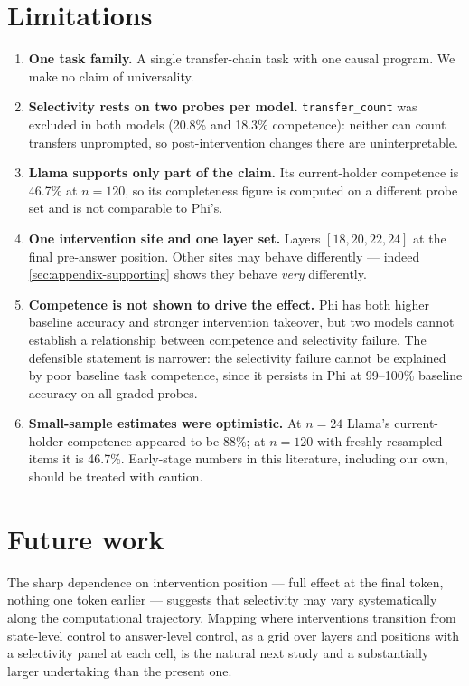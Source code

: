 \documentclass[11pt]{article}
\begin{document}
\section{Limitations}
\label{sec:limitations}

\begin{enumerate}
  \item \textbf{One task family.} A single transfer-chain task with one causal
    program. We make no claim of universality.
  \item \textbf{Selectivity rests on two probes per model.}
    \texttt{transfer\_count} was excluded in both models (20.8\% and 18.3\%
    competence): neither can count transfers unprompted, so post-intervention
    changes there are uninterpretable.
  \item \textbf{Llama supports only part of the claim.} Its current-holder
    competence is 46.7\% at $n=120$, so its completeness figure is computed on
    a different probe set and is not comparable to Phi's.
  \item \textbf{One intervention site and one layer set.} Layers
    $[18, 20, 22, 24]$ at the final pre-answer position. Other sites may
    behave differently --- indeed \cref{sec:appendix-supporting} shows they
    behave \emph{very} differently.
  \item \textbf{Competence is not shown to drive the effect.} Phi has both
    higher baseline accuracy and stronger intervention takeover, but two
    models cannot establish a relationship between competence and selectivity
    failure. The defensible statement is narrower: the selectivity failure
    cannot be explained by poor baseline task competence, since it persists in
    Phi at 99--100\% baseline accuracy on all graded probes.
  \item \textbf{Small-sample estimates were optimistic.} At $n=24$ Llama's
    current-holder competence appeared to be 88\%; at $n=120$ with freshly
    resampled items it is 46.7\%. Early-stage numbers in this literature,
    including our own, should be treated with caution.
\end{enumerate}

\section{Future work}
\label{sec:future-work}

The sharp dependence on intervention position --- full effect at the final
token, nothing one token earlier --- suggests that selectivity may vary
systematically along the computational trajectory. Mapping where interventions
transition from state-level control to answer-level control, as a grid over
layers and positions with a selectivity panel at each cell, is the natural
next study and a substantially larger undertaking than the present one.
\end{document}
